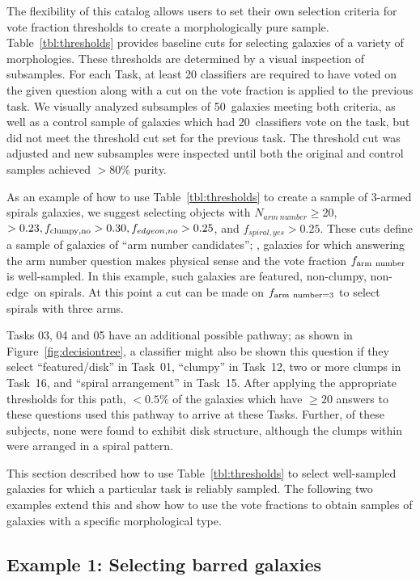 \documentclass[twocolumn]{aastex6}
\begin{document}
The flexibility of this catalog allows users to set their own selection
criteria for vote fraction thresholds to create a morphologically pure sample.
Table~\ref{tbl:thresholds} provides baseline cuts for selecting galaxies of a
variety of morphologies. These thresholds are determined by a visual inspection
of subsamples. For each Task, at least 20 classifiers are required to have voted on
the given question along with a cut on the vote fraction is applied to the
previous task. We visually analyzed subsamples of 50~galaxies meeting both
criteria, as well as a control sample of galaxies which had 20~classifiers vote on
the task, but did not meet the threshold cut set for the previous task. The
threshold cut was adjusted and new subsamples were inspected until both the
original and control samples achieved $>80\%$ purity.

As an example of how to use Table~\ref{tbl:thresholds} to create a sample of
3-armed spirals galaxies, we suggest selecting objects with $N_{arm~number} \ge
20$, \ffeatures$>0.23, f_{\rm clumpy,no} > 0.30, f_{edgeon,no}>0.25$, and
$f_{spiral,yes}>0.25$. These cuts define a sample of galaxies of ``arm number
candidates''; \ie, galaxies for which answering the arm number question makes
physical sense and the vote fraction $f_{\rm arm~number}$ is well-sampled. In
this example, such galaxies are featured, non-clumpy, non-edge~on spirals. At
this point a cut can be made on $f_{\rm arm~number=3}$ to select spirals with
three arms. 

Tasks 03, 04 and 05 have an additional possible pathway; as shown in
Figure~\ref{fig:decisiontree}, a classifier might also be shown this question
if they select ``featured/disk'' in Task~01, ``clumpy'' in Task~12, two or more
clumps in Task~16, and ``spiral arrangement'' in Task~15. After applying
the appropriate thresholds for this path, $< 0.5\%$ of the galaxies which
have $\ge 20$ answers to these questions used this pathway to arrive at
these Tasks.  Further, of these subjects, none were found to exhibit disk
structure, although the clumps within were arranged in a spiral pattern. 

This section described how to use Table~\ref{tbl:thresholds} to select
well-sampled galaxies for which a particular task is reliably sampled. The
following two examples extend this and show how to use the vote fractions to
obtain samples of galaxies with a specific morphological type.

\subsection{Example 1: Selecting barred galaxies} 
\end{document}
